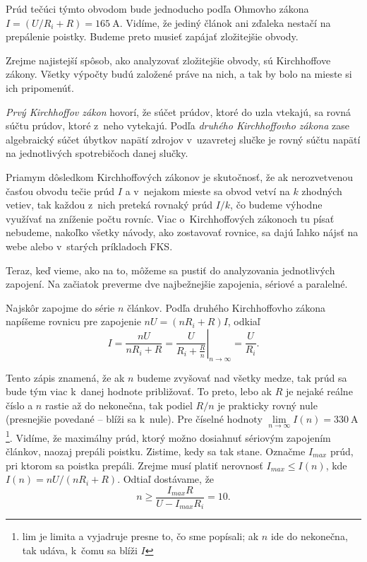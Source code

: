 

Prúd tečúci týmto obvodom bude jednoducho podľa Ohmovho zákona $I=(U/R_{i}+R)=\SI{165}{\ampere}$.
Vidíme, že jediný článok ani zďaleka nestačí na prepálenie poistky.
Budeme preto musieť zapájať zložitejšie obvody.

Zrejme najistejší spôsob, ako analyzovať zložitejšie obvody, sú Kirchhoffove
zákony. Všetky výpočty budú založené práve na nich, a tak by bolo
na mieste si ich pripomenúť. 

\emph{Prvý Kirchhoffov zákon} hovorí, že súčet
prúdov, ktoré do uzla vtekajú, sa rovná súčtu prúdov, ktoré z~neho
vytekajú. Podľa \emph{druhého Kirchhoffovho zákona} zase algebraický súčet
úbytkov napätí zdrojov v~uzavretej slučke je rovný súčtu napätí na
jednotlivých spotrebičoch danej slučky. 

Priamym dôsledkom Kirchhoffových
zákonov je skutočnosť, že ak nerozvetvenou časťou obvodu tečie prúd
$I$ a v~nejakom mieste sa obvod vetví na $k$ zhodných vetiev, tak
každou z~nich preteká rovnaký prúd $I/k$, čo budeme výhodne
využívať na zníženie počtu rovníc. Viac o~Kirchhoffových zákonoch
tu písať nebudeme, nakoľko všetky návody, ako zostavovať rovnice,
sa dajú ľahko nájsť na webe alebo v~starých príkladoch FKS.

Teraz, keď vieme, ako na to, môžeme sa pustiť do analyzovania jednotlivých
zapojení. Na začiatok preverme dve najbežnejšie zapojenia, sériové
a paralelné.




Najskôr zapojme do série $n$ článkov. Podľa druhého Kirchhoffovho zákona napíšeme rovnicu
pre zapojenie $nU=\left(nR_{i}+R\right)I$, odkiaľ 
\[
I=\frac{nU}{nR_{i}+R}=\left.\frac{U}{R_{i}+\frac{R}{n}}\right|_{n\rightarrow\infty}=\frac{U}{R_{i}}\textrm{.}
\]

Tento zápis znamená, že ak $n$ budeme zvyšovať nad všetky medze,
tak prúd sa bude tým viac k~danej hodnote približovať. To preto, lebo
ak $R$ je nejaké reálne číslo a $n$ rastie až do nekonečna, tak
podiel $R/n$ je prakticky rovný nule (presnejšie povedané --
blíži sa k~nule). Pre číselné hodnoty $\underset{n\rightarrow\infty}{\lim}I\left(n\right)=\SI{330}{\ampere}$\footnote{lim je limita a vyjadruje presne to, čo sme popísali; ak $n$ ide
do nekonečna, tak udáva, k~čomu sa blíži $I$}. Vidíme, že maximálny prúd, ktorý možno dosiahnuť sériovým zapojením
článkov, naozaj prepáli poistku. Zistime, kedy sa tak stane. Označme
$I_{max}$ prúd, pri ktorom sa poistka prepáli. Zrejme musí platiť
nerovnosť $I_{max}\leq I\left(n\right)$, kde $I\left(n\right)=nU/(nR_{i}+R)$.
Odtiaľ dostávame, že 
\[
n\geq\frac{I_{max}R}{U-I_{max}R_{i}}=10\textrm{.}
\]


